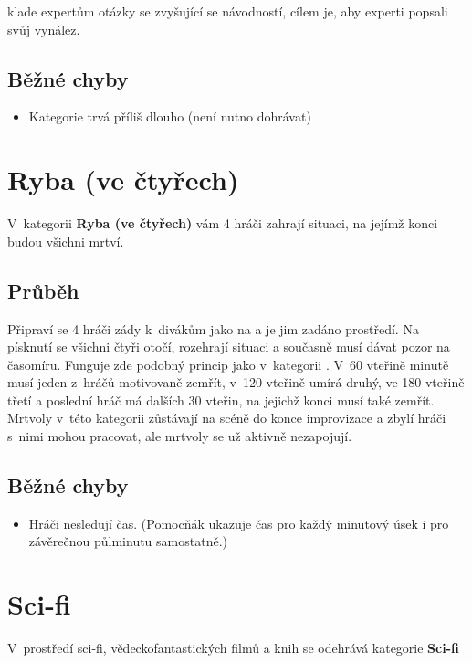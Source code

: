  klade expertům otázky se zvyšující se návodností, cílem je, aby experti popsali svůj vynález. 
 
\subsection{ Běžné chyby } \begin{itemize}
\item Kategorie trvá příliš dlouho (není nutno dohrávat)
\end{itemize}
 
 
 
\needspace{5cm} \section{Ryba (ve čtyřech)} \label{ryba (ve čtyřech)}  
 
 
V~kategorii \textbf{Ryba (ve čtyřech)} vám 4 hráči zahrají situaci, na jejímž konci budou všichni mrtví. 
 
\subsection{Průběh} Připraví se 4 hráči zády k~divákům jako na  a je jim zadáno prostředí. Na písknutí  se všichni čtyři otočí, rozehrají situaci a současně musí dávat pozor na časomíru. Funguje zde podobný princip jako v~kategorii . V~60 vteřině minutě musí jeden z~hráčů motivovaně zemřít, v~120 vteřině umírá druhý, ve 180 vteřině třetí a poslední hráč má dalších 30 vteřin, na jejichž konci musí také zemřít. Mrtvoly v~této kategorii zůstávají na scéně do konce improvizace a zbylí hráči s~nimi mohou pracovat, ale mrtvoly se už aktivně nezapojují. 
 
\subsection{ Běžné chyby } \begin{itemize}
\item Hráči nesledují čas. (Pomocňák ukazuje čas pro každý minutový úsek i pro závěrečnou půlminutu samostatně.)
\end{itemize}
 
 
 
 
\needspace{5cm} \section{Sci-fi} \label{sci-fi}  
V~prostředí sci-fi, vědeckofantastických filmů a knih se odehrává kategorie \textbf{Sci-fi} 
 
